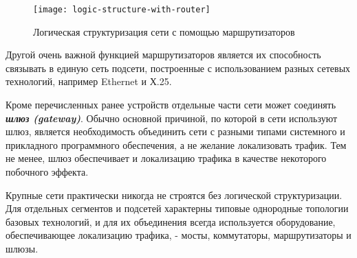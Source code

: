 \begin{figure}[!ht]
    \centering
    \texttt{[image: logic-structure-with-router]}
    \caption{Логическая структуризация сети с помощью маршрутизаторов}
    \label{fig:logic-structure-with-router}
\end{figure}

Другой очень важной функцией маршрутизаторов является их способность связывать в единую сеть подсети, построенные с использованием разных сетевых технологий, например Ethernet и Х.25.

Кроме перечисленных ранее устройств отдельные части сети может соединять \textbf{\textit{шлюз (gateway)}}.
Обычно основной причиной, по которой в сети используют шлюз, является необходимость объединить сети с разными типами системного и прикладного программного обеспечения, а не желание локализовать трафик.
Тем не менее, шлюз обеспечивает и локализацию трафика в качестве некоторого побочного эффекта.

Крупные сети практически никогда не строятся без логической структуризации.
Для отдельных сегментов и подсетей характерны типовые однородные топологии базовых технологий, и для их объединения всегда используется оборудование, обеспечивающее локализацию трафика, - мосты, коммутаторы, маршрутизаторы и шлюзы.
